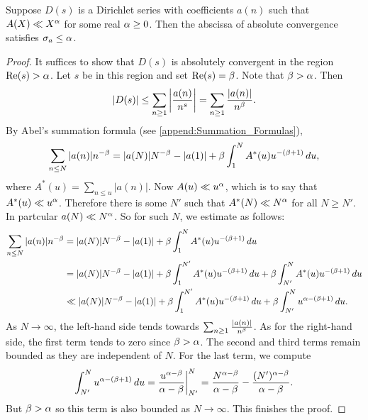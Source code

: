       \begin{proposition}\label{prop:Dirichlet_series_convergence_polynomial_bound_average}
        Suppose $D(s)$ is a Dirichlet series with coefficients $a(n)$ such that $A(X) \ll X^{\alpha}$ for some real $\alpha \ge 0$. Then the abscissa of absolute convergence satisfies $\sigma_{a} \le \alpha$.
      \end{proposition}
      \begin{proof}
        It suffices to show that $D(s)$ is absolutely convergent in the region $\mathrm{Re}(s) > \alpha$. Let $s$ be in this region and set $\mathrm{Re}(s) = \beta$. Note that $\beta > \alpha$. Then
        \[
          |D(s)| \le \sum_{n \ge 1}\left|\frac{a(n)}{n^{s}}\right| = \sum_{n \ge 1}\frac{|a(n)|}{n^{\beta}}.
        \]
        By Abel's summation formula (see \cref{append:Summation_Formulas}),
        \[
          \sum_{n \le N}|a(n)|n^{-\beta} = |a(N)|N^{-\beta}-|a(1)|+\beta\int_{1}^{N}A^{\ast}(u)u^{-(\beta+1)}\,du,
        \]
        where $A^{\ast}(u) = \sum_{n \le u}|a(n)|$. Now $A(u) \ll u^{\alpha}$, which is to say that $A^{\ast}(u) \ll u^{\alpha}$. Therefore there is some $N'$ such that $A^{\ast}(N) \ll N^{\alpha}$ for all $N \ge N'$. In partcular $a(N) \ll N^{\alpha}$. So for such $N$, we estimate as follows:
        \begin{align*}
          \sum_{n \le N}|a(n)|n^{-\beta} &= |a(N)|N^{-\beta}-|a(1)|+\beta\int_{1}^{N}A^{\ast}(u)u^{-(\beta+1)}\,du \\
          &= |a(N)|N^{-\beta}-|a(1)|+\beta\int_{1}^{N'}A^{\ast}(u)u^{-(\beta+1)}\,du+\beta\int_{N'}^{N}A^{\ast}(u)u^{-(\beta+1)}\,du \\
          &\ll |a(N)|N^{-\beta}-|a(1)|+\beta\int_{1}^{N'}A^{\ast}(u)u^{-(\beta+1)}\,du+\beta\int_{N'}^{N}u^{\alpha-(\beta+1)}\,du.
        \end{align*}
        As $N \to \infty$, the left-hand side tends towards $\sum_{n \ge 1}\frac{|a(n)|}{n^{\beta}}$. As for the right-hand side, the first term tends to zero since $\beta > \alpha$. The second and third terms remain bounded as they are independent of $N$. For the last term, we compute
        \[
          \int_{N'}^{N}u^{\alpha-(\beta+1)}\,du = \frac{u^{\alpha-\beta}}{\alpha-\beta}\bigg|_{N'}^{N} = \frac{N^{\alpha-\beta}}{\alpha-\beta}-\frac{(N')^{\alpha-\beta}}{\alpha-\beta}.
        \]
        But $\beta > \alpha$ so this term is also bounded as $N \to \infty$. This finishes the proof.
      \end{proof}

